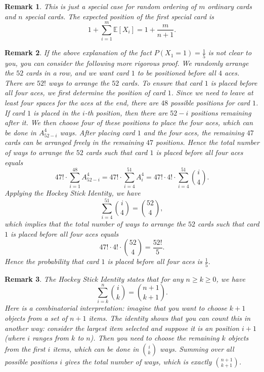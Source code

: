 \documentclass[12pt,letterpaper, onecolumn]{exam}
\newtheorem{remark}{Remark}
\begin{document}
\begin{questions}
        \begin{remark}
            This is just a special case for random ordering of $m$ ordinary cards and $n$ special cards. The expected position of the first special card is 
            $$1+\sum\limits_{i=1}^m\mathbb{E}[X_i]=1+\frac{m}{n+1}.$$
        \end{remark}
        \begin{remark}
            If the above explanation of the fact $P(X_1=1)=\frac{1}{5}$ is not clear to you, you can consider the following more rigorous proof. We randomly arrange the $52$ cards in a row, and we want card $1$ to be positioned before all $4$ aces. There are $52!$ ways to arrange the $52$ cards. To ensure that card $1$ is placed before all four aces, we first determine the position of card $1$. Since we need to leave at least four spaces for the aces at the end, there are $48$ possible positions for card $1$. If card $1$ is placed in the $i$-th position, then there are $52-i$ positions remaining after it. We then choose four of these positions to place the four aces, which can be done in $A_{52-i}^4$ ways. After placing card $1$ and the four aces, the remaining $47$ cards can be arranged freely in the remaining $47$ positions. Hence the total number of ways to arrange the $52$ cards such that card $1$ is placed before all four aces equals
            $$47!\cdot\sum\limits_{i=1}^{48}A_{52-i}^4=47!\cdot\sum\limits_{i=4}^{51}A_i^4=47!\cdot 4!\cdot\sum\limits_{i=4}^{51}\binom{i}{4}.$$
            Applying the Hockey Stick Identity, we have 
            $$\sum\limits_{i=4}^{51}\binom{i}{4}=\binom{52}{4},$$
            which implies that the total number of ways to arrange the $52$ cards such that card $1$ is placed before all four aces equals
            $$47!\cdot 4!\cdot\binom{52}{4}=\frac{52!}{5}.$$
            Hence the probability that card $1$ is placed before all four aces is $\frac{1}{5}$.
        \end{remark}
        \begin{remark}
            The Hockey Stick Identity states that for any $n\ge k\ge 0$, we have 
            $$\sum\limits_{i=k}^n\binom{i}{k}=\binom{n+1}{k+1}.$$
            Here is a combinatorial interpretation: imagine that you want to choose $k+1$ objects from a set of $n+1$ items. The identity shows that you can count this in another way: consider the largest item selected and suppose it is an position $i+1$ (where $i$ ranges from $k$ to $n$). Then you need to choose the remaining $k$ objects from the first $i$ items, which can be done in $\binom{i}{k}$ ways. Summing over all possible positions $i$ gives the total number of ways, which is exactly $\binom{n+1}{k+1}$.

\end{remark}
\end{questions}
\end{document}
